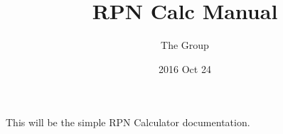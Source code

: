 ﻿\documentclass[12pt]{article}
\title{RPN Calc Manual}
\author{The Group}
\date{2016 Oct 24}
\begin{document}
\setlength{\parindent}{0em}

\maketitle

This will be the simple RPN Calculator documentation.
\end{document}
